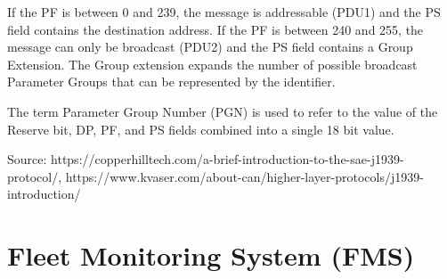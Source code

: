 If the PF is between 0 and 239, the message is addressable (PDU1) and the PS field contains the destination address.
If the PF is between 240 and 255, the message can only be broadcast (PDU2) and the PS field contains a Group Extension.
The Group extension expands the number of possible broadcast Parameter Groups that can be represented by the identifier.

The term Parameter Group Number (PGN) is used to refer to the value of the Reserve bit, DP, PF, and PS fields combined into a single 18 bit value.

Source: https://copperhilltech.com/a-brief-introduction-to-the-sae-j1939-protocol/,
https://www.kvaser.com/about-can/higher-layer-protocols/j1939-introduction/

\section{Fleet Monitoring System (FMS)}

